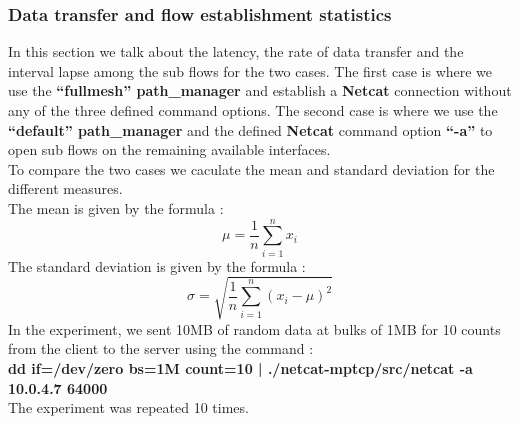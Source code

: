 \documentclass[a4paper,11pt]{article}
\begin{document}
			\subsubsection{Data transfer and flow establishment statistics}
			\label{subsubsec:datatransferandflowestablish}
			In this section we talk about the latency, the rate of data transfer and the interval lapse among the sub flows for the two cases. The first case is where we use the \textbf{``fullmesh'' path\_manager} and establish a \textbf{Netcat} connection without any of the three defined command options. The second case is where we use the \textbf{``default'' path\_manager} and the defined \textbf{Netcat} command option \textbf{``-a''} to open sub flows on the remaining available interfaces. \\

			To compare the two cases we caculate the mean and standard deviation for the different measures. \\

			The mean is given by the formula :
			$$\mu = \frac{1}{n}\sum_{i=1}^{n}x_i$$
			The standard deviation is given by the formula :
			$$\sigma = \sqrt{\frac{1}{n}\sum_{i=1}^{n}(x_i - \mu)^2}$$
			In the experiment, we sent 10MB of random data at bulks of 1MB for 10 counts from the client to the server using the command : \\
			\textbf{dd if=/dev/zero bs=1M count=10 | ./netcat-mptcp/src/netcat -a 10.0.4.7 64000} \\
			The experiment was repeated 10 times.
\end{document}
